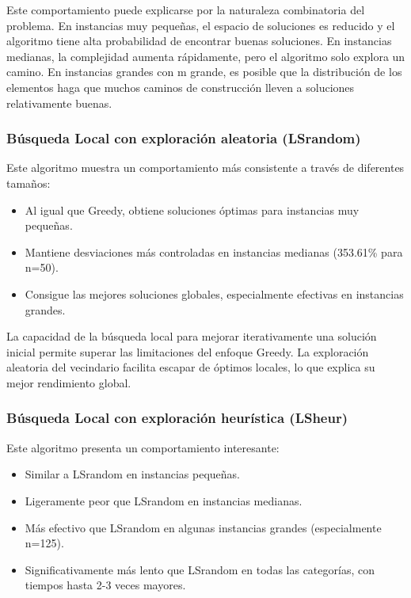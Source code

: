 \documentclass{article}
\begin{document}
Este comportamiento puede explicarse por la naturaleza combinatoria del problema. En instancias muy pequeñas, el espacio de soluciones es reducido y el algoritmo tiene alta probabilidad de encontrar buenas soluciones. En instancias medianas, la complejidad aumenta rápidamente, pero el algoritmo solo explora un camino. En instancias grandes con m grande, es posible que la distribución de los elementos haga que muchos caminos de construcción lleven a soluciones relativamente buenas.

\subsubsection{Búsqueda Local con exploración aleatoria (LSrandom)}

Este algoritmo muestra un comportamiento más consistente a través de diferentes tamaños:

\begin{itemize}
    \item Al igual que Greedy, obtiene soluciones óptimas para instancias muy pequeñas.
    \item Mantiene desviaciones más controladas en instancias medianas (353.61\% para n=50).
    \item Consigue las mejores soluciones globales, especialmente efectivas en instancias grandes.
\end{itemize}

La capacidad de la búsqueda local para mejorar iterativamente una solución inicial permite superar las limitaciones del enfoque Greedy. La exploración aleatoria del vecindario facilita escapar de óptimos locales, lo que explica su mejor rendimiento global.

\subsubsection{Búsqueda Local con exploración heurística (LSheur)}

Este algoritmo presenta un comportamiento interesante:

\begin{itemize}
    \item Similar a LSrandom en instancias pequeñas.
    \item Ligeramente peor que LSrandom en instancias medianas.
    \item Más efectivo que LSrandom en algunas instancias grandes (especialmente n=125).
    \item Significativamente más lento que LSrandom en todas las categorías, con tiempos hasta 2-3 veces mayores.
\end{itemize}
\end{document}

